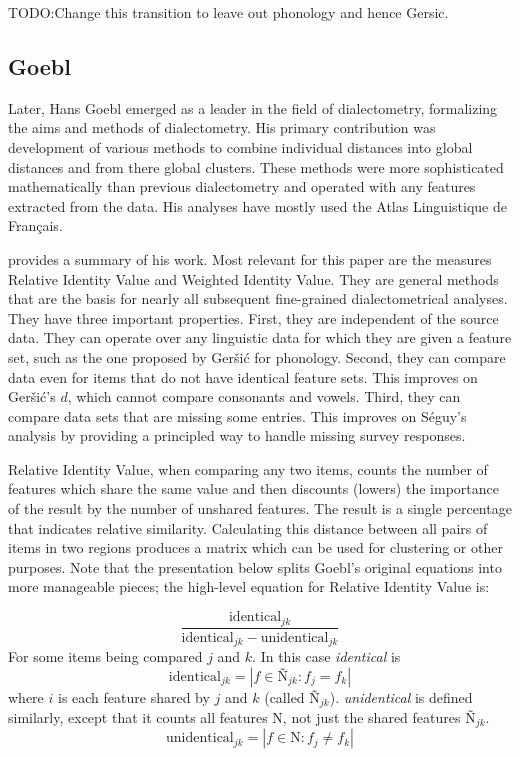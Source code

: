 \documentclass[11pt]{article}
\begin{document}
TODO:Change this transition to leave out phonology and hence Gersic.

\subsection{Goebl}

Later, Hans Goebl emerged as a leader in the field of dialectometry,
formalizing the aims and methods of dialectometry. His primary
contribution was development of various methods to combine individual
distances into global distances and from there global clusters. These
methods were more sophisticated mathematically than previous
dialectometry and operated with any features extracted from the data. His
analyses have mostly used the Atlas Linguistique de Fran\c{c}ais.

 provides a summary of his work. Most relevant for
this paper are the measures Relative Identity Value and Weighted
Identity Value. They are general methods that are the basis for nearly
all subsequent fine-grained dialectometrical analyses. They have three
important properties. First, they are independent of the source
data. They can operate over any linguistic data for which they are
given a feature set, such as the one proposed by Ger\v{s}i\'c for
phonology. Second, they can compare data even for items that do not
have identical feature sets. This improves on Ger\v{s}i\'c's $d$,
which cannot compare consonants and vowels. Third, they can compare
data sets that are missing some entries. This improves on S\'eguy's
analysis by providing a principled way to handle missing survey
responses.

Relative Identity Value, when comparing any two items, counts the
number of features which share the same value and then discounts
(lowers) the importance of the result by the number of unshared
features. The result is a single percentage that indicates
relative similarity. Calculating this distance between all pairs
of items in two regions produces a matrix which can be used for
clustering or other purposes. Note that the presentation below splits
Goebl's original equations into more manageable pieces; the high-level
equation for Relative Identity Value is:

\begin{equation}
  \frac{\textrm{identical}_{jk}} {\textrm{identical}_{jk} - \textrm{unidentical}_{jk}}
\label{riv}
\end{equation}
For some items being compared $j$ and $k$. In this case
\textit{identical} is
\begin{equation}
  \textrm{identical}_{jk} = |f \in \textrm{\~N}_{jk} : f_j = f_k|
\end{equation}
where $i$ is each feature shared by $j$ and $k$ (called
$\textrm{\~N}_{jk}$). \textit{unidentical} is defined similarly, except
that it counts all features N, not just the shared features
$\textrm{\~N}_{jk}$.
\begin{equation}
  \textrm{unidentical}_{jk} = |f \in \textrm{N} : f_j \neq f_k|
\end{equation}
\end{document}
